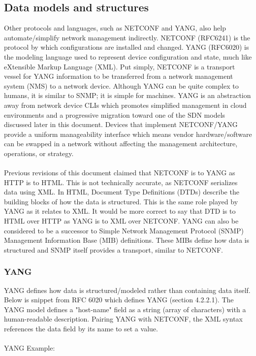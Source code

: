 \subsection{Data models and structures}
Other protocols and languages, such as NETCONF and YANG, also help
automate/simplify network management indirectly. NETCONF (RFC6241) is the
protocol by which configurations are installed and changed. YANG (RFC6020) is
the modeling language used to represent device configuration and state, much
like eXtensible Markup Language (XML). Put simply, NETCONF is a transport
vessel for YANG information to be transferred from a network management system
(NMS) to a network device. Although YANG can be quite complex to humans, it is
similar to SNMP; it is simple for machines. YANG is an abstraction away from
network device CLIs which promotes simplified management in cloud environments
and a progressive migration toward one of the SDN models discussed later in
this document. Devices that implement NETCONF/YANG provide a uniform
manageability interface which means vendor hardware/software can be swapped in
a network without affecting the management architecture, operations, or strategy.
\\ \\
Previous revisions of this document claimed that NETCONF is to YANG as HTTP is
to HTML. This is not technically accurate, as NETCONF serializes data using
XML. In HTML, Document Type Definitions (DTDs) describe the building blocks of
how the data is structured. This is the same role played by YANG as it relates
to XML. It would be more correct to say that DTD is to HTML over HTTP as YANG
is to XML over NETCONF. YANG can also be considered to be a successor to
Simple Network Management Protocol (SNMP) Management Information Base (MIB)
definitions. These MIBs define how data is structured and SNMP itself provides
a transport, similar to NETCONF.

\subsubsection{YANG}
YANG defines how data is structured/modeled rather than containing data
itself. Below is snippet from RFC 6020 which defines YANG (section 4.2.2.1).
The YANG model defines a "host-name" field as a string (array of characters)
with a human-readable description. Pairing YANG with NETCONF, the XML syntax
references the data field by its name to set a value.
\\ \\
YANG Example:

